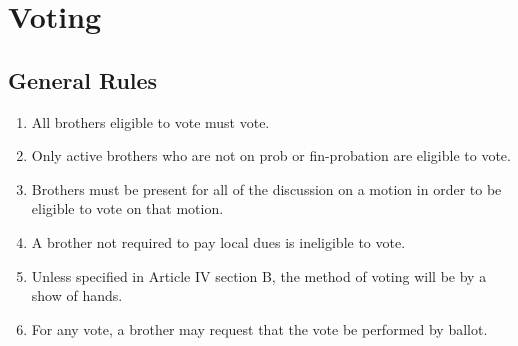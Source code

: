 \chapter{Voting}

\section{General Rules}

	\begin{enumerate}
		\item All brothers eligible to vote must vote.

		\item Only active brothers who are not on \gls{prob} or \gls{fin-probation} are eligible to vote.

		\item Brothers must be present for all of the discussion on a motion in order to be eligible to vote on that motion.\label{voting-present} 

		\item A brother not required to pay local dues is ineligible to vote. %

		\item Unless specified in Article IV section B, the method of voting will be by a show of hands. 

		\item For any vote, a brother may request that the vote be performed by ballot.

	\end{enumerate}


